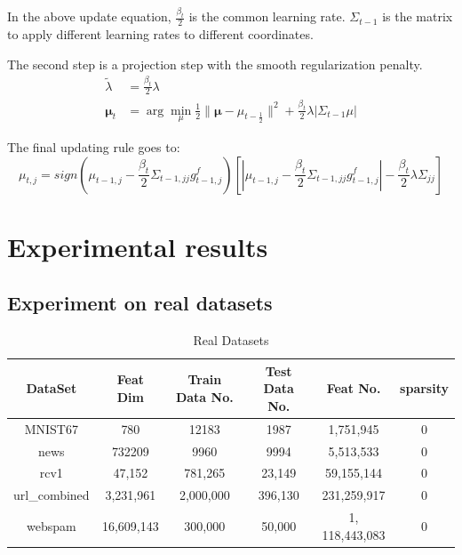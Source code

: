 \documentclass{article}
\begin{document}
In the above update equation, $\frac{\beta_t}{2}$ is the common learning rate.
$\Sigma_{t-1}$ is the matrix to apply different learning rates to different
coordinates.

The second step is a projection step with the smooth regularization penalty.
\begin{equation}
    \begin{aligned}
        \tilde{\lambda} &= \frac{\beta_t}{2} \lambda \\
        \bm{\mu}_{t} &= \arg\min_{\mu}{\frac{1}{2}\|\bm{\mu} -
        \mu_{t-\frac{1}{2}}\|^2
        + \frac{\beta_t}{2}\lambda|\Sigma_{t-1}\mu|}
    \end{aligned}
    \label{equ:08}
\end{equation}


The final updating rule goes to:
\begin{equation}
    \mu_{t,j} = sign(\mu_{t-1,j} -
    \frac{\beta_t}{2}\Sigma_{t-1,jj}g_{t-1,j}^f)
    [|\mu_{t-1,j} - \frac{\beta_t}{2}\Sigma_{t-1,jj}g_{t-1,j}^f| -
    \frac{\beta_t}{2}\lambda\Sigma_{jj}]
    \label{equ:09}
\end{equation}

\section{Experimental results}
\subsection{Experiment on real datasets}

\begin{table}[!ht]
\renewcommand{\arraystretch}{1.3}
\caption{Real Datasets}
\label{tbl:01}
\centering
\begin{tabular}{|c|c|c|c|c|c|}
\hline
DataSet& Feat Dim & Train Data No. & Test Data No. & Feat No. & sparsity\\
\hline
MNIST67 & 780 & 12183 & 1987 & 1,751,945 & 0\\
\hline
news & 732209 & 9960 & 9994 & 5,513,533 & 0\\
\hline
rcv1& 47,152  & 781,265 & 23,149 &59,155,144 & 0\\
\hline
url\_combined & 3,231,961 & 2,000,000 & 396,130 &231,259,917 & 0\\
\hline
webspam& 16,609,143 &300,000 & 50,000 &1, 118,443,083 & 0\\
\hline
\end{tabular}
\end{table}
\end{document}
